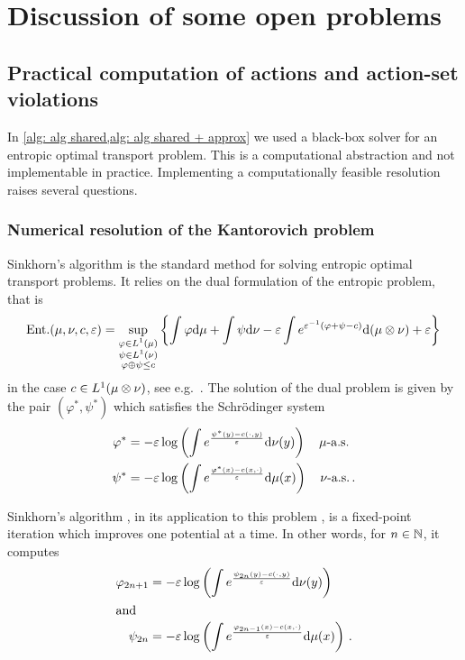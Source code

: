 \section{Discussion of some open problems}\label{app: open problems}

\subsection{Practical computation of actions and action-set violations}\label{subsec: action feasibility}


In \cref{alg: alg shared,alg: alg shared + approx} we used a black-box solver for an entropic optimal transport problem. This is a computational abstraction and not implementable in practice. Implementing a computationally feasible resolution raises several questions. 

\subsubsection{Numerical resolution of the Kantorovich problem}

Sinkhorn's algorithm is the standard method for solving entropic optimal transport problems. It relies on the dual formulation of the entropic problem, that is
\begin{align}
    \ent(\mu,\nu,c,\ve) = \sup_{\substack{\varphi\in L^1(\mu)\\\psi\in L^1(\nu)\\\varphi\oplus\psi\le c}} \left\{\int \varphi\de\mu + \int \psi\de\nu - \ve\int e^{\ve^{-1}(\varphi+\psi-c)}\de(\mu\tensor\nu) + \ve\right\}\,\notag%
\end{align}
in the case $c\in L^1(\mu\otimes\nu)$, see e.g.\ \cite[Thm.~4.7]{nutz_introduction_2022}. The solution of the dual problem is given by the pair $(\varphi^*,\psi^*)$ which satisfies the Schrödinger system
\begin{align*}
    \varphi^*&=-\varepsilon\log\left(\int e^{\frac{\psi^*(y)-c(\cdot,y)}{\varepsilon}}\mathrm{d}\nu(y)\right) \quad \mu\mbox{-a.s.}\\
    \psi^*&=-\varepsilon\log\left(\int e^{\frac{\varphi^*(x)-c(x,\cdot)}{\varepsilon}}\mathrm{d}\mu(x)\right) \quad \nu\mbox{-a.s.}\,.
\end{align*}

Sinkhorn's algorithm \citep{sinkhorn_concerning_1967}, in its application to this problem \citep{cuturi_sinkhorn_2013}, is a fixed-point iteration which improves one potential at a time. In other words, for $n\in\mathbb{N}$, it computes
\begin{align*}
    \varphi_{2n+1}&=-\varepsilon\log\left(\int e^{\frac{\psi_{2n}(y)-c(\cdot,y)}{\varepsilon}}\mathrm{d}\nu(y)\right) \\
    \intertext{and}
    \psi_{2n}&=-\varepsilon\log\left(\int e^{\frac{\varphi_{2n-1}(x)-c(x,\cdot)}{\varepsilon}}\mathrm{d}\mu(x)\right)\,.
\end{align*}


